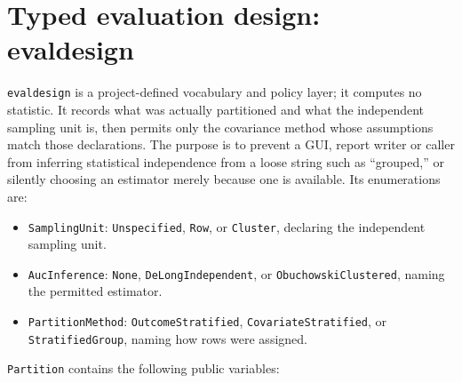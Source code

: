 \section{Typed evaluation design: evaldesign}\label{evaldesign_objects}

\texttt{evaldesign} is a project-defined vocabulary and policy layer; it
computes no statistic.  It records what was actually partitioned and what the
independent sampling unit is, then permits only the covariance method whose
assumptions match those declarations.  The purpose is to prevent a GUI, report
writer or caller from inferring statistical independence from a loose string
such as ``grouped,'' or silently choosing an estimator merely because one is
available.  Its enumerations are:

\begin{itemize}
\item \texttt{SamplingUnit}: \texttt{Unspecified}, \texttt{Row}, or
      \texttt{Cluster}, declaring the independent sampling unit.
\item \texttt{AucInference}: \texttt{None}, \texttt{DeLongIndependent}, or
      \texttt{ObuchowskiClustered}, naming the permitted estimator.
\item \texttt{PartitionMethod}: \texttt{OutcomeStratified},
      \texttt{CovariateStratified}, or \texttt{StratifiedGroup}, naming how
      rows were assigned.
\end{itemize}

\texttt{Partition} contains the following public variables:

